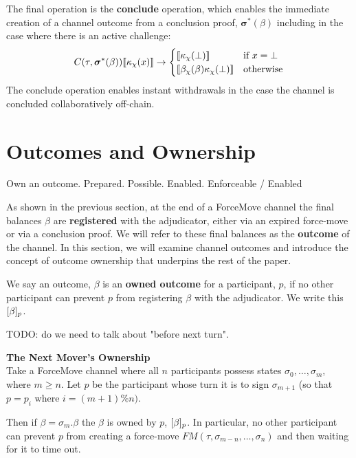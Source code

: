 The final operation is the \textbf{conclude} operation, which enables the immediate creation of a channel outcome from a conclusion proof, $\bm{\sigma}^*(\beta)$ including in the case where there is an active challenge:
\begin{align*}
C(\tau, \bm{\sigma}^*(\beta)) \llbracket \kappa_\chi(x) \rrbracket \rightarrow 
\begin{cases}
  \llbracket \kappa_\chi(\bot) \rrbracket & \text{if } x = \bot \\
  \llbracket \beta_\chi(\beta) \kappa_\chi(\bot) \rrbracket &
  \text{otherwise}
\end{cases}
\end{align*}
The conclude operation enables instant withdrawals in the case the channel is concluded collaboratively off-chain.





\section{Outcomes and Ownership}

Own an outcome. Prepared. Possible. Enabled.
Enforceable / Enabled

As shown in the previous section, at the end of a ForceMove channel the final balances $\beta$ are \textbf{registered} with the adjudicator, either via an expired force-move or via a conclusion proof. We will refer to these final balances as the \textbf{outcome} of the channel. In this section, we will examine channel outcomes and introduce the concept of outcome ownership that underpins the rest of the paper.

We say an outcome, $\beta$ is an \textbf{owned outcome} for a participant, $p$, if no other participant can prevent $p$ from registering $\beta$ with the adjudicator. We write this $[\beta]_p$.

TODO: do we need to talk about "before next turn".

\begin{exmp}
  \textbf{The Next Mover's Ownership} \\
  Take a ForceMove channel where all $n$ participants possess states $\sigma_0, \dots, \sigma_m$, where $m \geq n$. Let $p$ be the participant whose turn it is to sign $\sigma_{m+1}$ (so that $p = p_i$ where $i = (m+1)\%n)$. 

  Then if $\beta = \sigma_m.\beta$ the $\beta$ is owned by $p$, $[\beta]_p$. In particular, no other participant can prevent $p$ from 
  creating a force-move $FM(\tau, \sigma_{m-n}, \dots, \sigma_n)$ and then waiting for it to time out.
\end{exmp}


